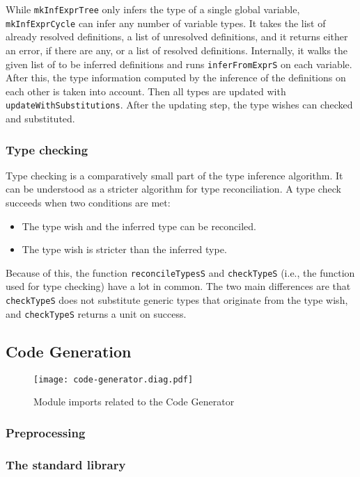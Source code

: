 \documentclass[12pt]{article}
\begin{document}
While \verb$mkInfExprTree$ only infers the type of a single global variable,
\verb$mkInfExprCycle$ can infer any number of variable types. It takes the list
of already resolved definitions, a list of unresolved definitions, and it
returns either an error, if there are any, or a list of resolved definitions.
Internally, it walks the given list of to be inferred definitions and runs
\verb$inferFromExprS$ on each variable. After this, the type information
computed by the inference of the definitions on each other is taken into
account. Then all types are updated with \verb$updateWithSubstitutions$. After
the updating step, the type wishes can checked and substituted.

\subsubsection{Type checking}

Type checking is a comparatively small part of the type inference algorithm. It
can be understood as a stricter algorithm for type reconciliation. A type check
succeeds when two conditions are met: 
\begin{itemize}
    \item The type wish and the inferred type can be reconciled.
    \item The type wish is stricter than the inferred type.
\end{itemize}
Because of this, the function \verb$reconcileTypesS$ and \verb$checkTypeS$
(i.e., the function used for type checking) have a lot in common. The two main
differences are that \verb$checkTypeS$ does not substitute generic types that
originate from the type wish, and \verb$checkTypeS$ returns a unit on success.

\subsection{Code Generation}

\begin{figure}[h]
\texttt{[image: code-generator.diag.pdf]}
\centering
\caption{Module imports related to the Code Generator}
\end{figure}

\subsubsection{Preprocessing}
\subsubsection{The standard library}
\end{document}
